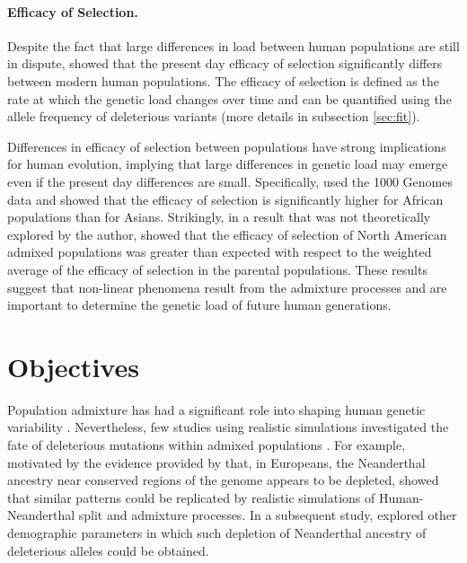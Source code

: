 \documentclass[a4paper, 12pt]{article}
\begin{document}
\paragraph{Efficacy of Selection.} Despite the fact that large differences in
load between human populations are still in dispute, \cite{Gravel2016} showed
that the present day efficacy of selection significantly differs between modern
human populations. The efficacy of selection is defined as the rate at which
the genetic load changes over time and can be quantified using the allele
frequency of deleterious variants (more details in subsection \ref{sec:fit}).

Differences in efficacy of selection between populations have strong
implications for human evolution, implying that large differences in genetic
load may emerge  even if the present day differences are small.  Specifically,
\cite{Gravel2016} used the 1000 Genomes data and showed that the efficacy of
selection is significantly higher for African populations than for Asians.
Strikingly, in a result that was not theoretically explored by the author,
\cite{Gravel2016} showed that the efficacy of selection of North American
admixed populations was greater than expected with respect to the weighted
average of the efficacy of selection in the parental populations.  These
results suggest that non-linear phenomena result from the admixture processes
and are important to determine the genetic load of future human generations.


\section{Objectives}


Population admixture has had a significant role into shaping  human
genetic variability \citep{Wall2016}. Nevertheless, few studies using realistic
simulations investigated the fate of deleterious mutations within admixed
populations \citep{Harris2016a, Kim2017a}. For example, motivated by the
evidence provided by \citep{Sankararaman2014} that, in  Europeans,
the Neanderthal ancestry near conserved regions of the genome appears to be
depleted, \cite{Harris2016a} showed that similar patterns could be replicated
by realistic simulations of Human-Neanderthal split and admixture processes. In
a subsequent study, \citep{Kim2017a} explored other demographic parameters in
which such depletion of Neanderthal ancestry of deleterious alleles could be obtained.
\end{document}
